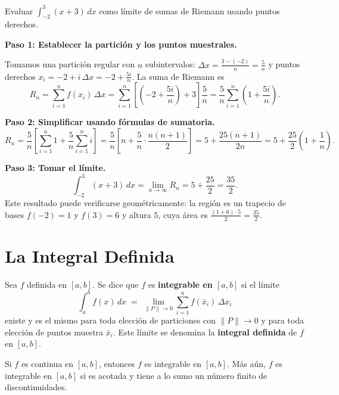 \begin{example}
Evaluar $\displaystyle\int_{-2}^{3} (x+3)\,dx$ como límite de sumas de Riemann usando puntos derechos.

\begin{myproof}

\textbf{Paso 1: Establecer la partición y los puntos muestrales.}

Tomamos una partición regular con $n$ subintervalos: $\Delta x = \frac{3-(-2)}{n} = \frac{5}{n}$ y puntos derechos $x_i = -2 + i\,\Delta x = -2 + \frac{5i}{n}$. La suma de Riemann es
\[
R_n = \sum_{i=1}^{n} f(x_i)\,\Delta x
= \sum_{i=1}^{n} \left[\left(-2+\frac{5i}{n}\right)+3\right]\frac{5}{n}
= \frac{5}{n}\sum_{i=1}^{n}\left(1 + \frac{5i}{n}\right).
\]

\textbf{Paso 2: Simplificar usando fórmulas de sumatoria.}
\[
R_n = \frac{5}{n}\left[\sum_{i=1}^{n}1 + \frac{5}{n}\sum_{i=1}^{n}i\right]
= \frac{5}{n}\left[n + \frac{5}{n}\cdot\frac{n(n+1)}{2}\right]
= 5 + \frac{25(n+1)}{2n}
= 5 + \frac{25}{2}\left(1+\frac{1}{n}\right).
\]

\textbf{Paso 3: Tomar el límite.}
\[
\boxed{\int_{-2}^{3}(x+3)\,dx = \lim_{n\to\infty} R_n = 5 + \frac{25}{2} = \frac{35}{2}.}
\]
Este resultado puede verificarse geométricamente: la región es un trapecio de bases $f(-2)=1$ y $f(3)=6$ y altura $5$, cuya área es $\frac{(1+6)\cdot 5}{2} = \frac{35}{2}$.
\end{myproof}
\end{example}

\section{La Integral Definida}

\begin{definition}
Sea $f$ definida en $[a,b]$. Se dice que $f$ es \textbf{integrable en $[a,b]$} si el límite
\[
\int_{a}^{b} f(x)\,dx \;=\; \lim_{\|P\|\to 0} \sum_{i=1}^{n} f(\bar{x}_i)\,\Delta x_i
\]
existe y es el mismo para toda elección de particiones con $\|P\|\to 0$ y para toda elección de puntos muestra $\bar{x}_i$. Este límite se denomina la \textbf{integral definida} de $f$ en $[a,b]$.
\end{definition}

\begin{theorem}
Si $f$ es continua en $[a,b]$, entonces $f$ es integrable en $[a,b]$. Más aún, $f$ es integrable en $[a,b]$ si es acotada y tiene a lo sumo un número finito de discontinuidades.
\end{theorem}

